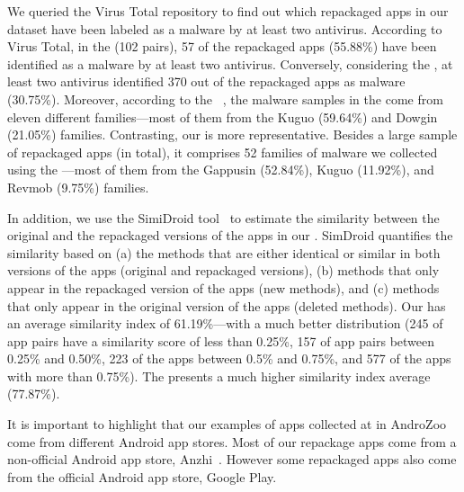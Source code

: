 We queried the Virus Total repository to find out which repackaged apps in our
dataset have been labeled as a malware by at least two antivirus. According to Virus Total, in the \sds (102 pairs),
57 of the repackaged apps (55.88\%) have been identified as a malware by at least two
antivirus. Conversely, considering the \cds, at least two antivirus identified 370 out of the \apps repackaged apps as malware (30.75\%).
Moreover, according to the
\avt~\cite{avclass2-paper}, the malware samples in the \sds come from eleven different families---most of them from the Kuguo (59.64\%) and Dowgin (21.05\%) families.
Contrasting, our \cds is more representative. Besides a large sample of repackaged apps (\apps in total), it
comprises 52 families of malware we collected using the \avt ---most
of them from the Gappusin (52.84\%), Kuguo (11.92\%), and Revmob (9.75\%) families.

In addition, we use the SimiDroid tool~\cite{DBLP:conf/trustcom/0029BK17} to
estimate the similarity between the original and the repackaged versions of the
apps in our \cds. SimDroid quantifies the similarity
based on (a) the methods that are either identical or similar in both versions of the apps (original and repackaged versions),
(b) methods that only appear in the repackaged version of the apps (new methods), and (c) methods that only appear in the
original version of the apps (deleted methods).
Our \cds has an average similarity index of 61.19\%---with a much better distribution (245 of
app pairs have a similarity score of less than 0.25\%, 157 of app pairs
between 0.25\% and 0.50\%, 223 of the apps between 0.5\% and 0.75\%,
and 577 of the apps with more than 0.75\%). The \sds presents a much higher
similarity index average (77.87\%). 

It is important to highlight that our examples of apps collected at in AndroZoo come from different Android app stores. Most of our repackage apps come from a non-official Android app store, Anzhi~\cite{anzhi}. However some repackaged apps also come from the official Android app store, Google Play.






